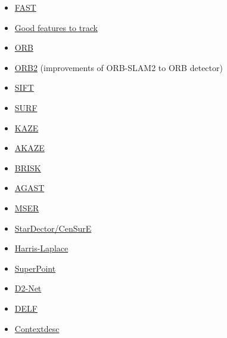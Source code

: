 \documentclass{article}
\begin{document}
\begin{itemize}
    \item \href{https://www.edwardrosten.com/work/fast.html}{FAST} \cite{rosten2006machine}
    \item \href{https://ieeexplore.ieee.org/document/323794}{Good features to track} \cite{shi1994good}
    \item \href{http://www.willowgarage.com/sites/default/files/orb_final.pdf}{ORB} \cite{rublee2011orb}
    \item \href{https://github.com/raulmur/ORB_SLAM2}{ORB2} (improvements of ORB-SLAM2\cite{ORB_SLAM2} to ORB detector)
    \item \href{https://www.cs.ubc.ca/~lowe/papers/iccv99.pdf}{SIFT} \cite{lowe1999object}
    \item \href{http://people.ee.ethz.ch/~surf/eccv06.pdf}{SURF} \cite{bay2006surf}
    \item \href{https://www.doc.ic.ac.uk/~ajd/Publications/alcantarilla_etal_eccv2012.pdf}{KAZE} \cite{alcantarilla2012kaze}
    \item \href{http://www.bmva.org/bmvc/2013/Papers/paper0013/paper0013.pdf}{AKAZE} \cite{alcantarilla2013fast}
    \item \href{http://www.margaritachli.com/papers/ICCV2011paper.pdf}{BRISK} \cite{leutenegger2011brisk}
    \item \href{chrome-extension://efaidnbmnnnibpcajpcglclefindmkaj/https://archive.air.in.tum.de/Main/Publications/Mair2010c.pdf}{AGAST} \cite{mair2010adaptive}
    \item \href{http://cmp.felk.cvut.cz/~matas/papers/matas-bmvc02.pdf}{MSER} \cite{matas2002robust}
    \item \href{https://link.springer.com/chapter/10.1007/978-3-540-88693-8_8}{StarDector/CenSurE} \cite{censure}
    \item \href{https://www.robots.ox.ac.uk/~vgg/research/affine/det_eval_files/mikolajczyk_ijcv2004.pdf}{Harris-Laplace} \cite{mikolajczyk_inria00548554}
    \item \href{https://github.com/MagicLeapResearch/SuperPointPretrainedNetwork}{SuperPoint}\cite{detone18superpoint}
    \item \href{https://github.com/mihaidusmanu/d2-net}{D2-Net} \cite{dusmanu2019d2}
    \item \href{https://github.com/tensorflow/models/tree/master/research/delf}{DELF} \cite{noh2017large}
    \item \href{https://github.com/lzx551402/contextdesc}{Contextdesc} \cite{luo2020contextdesc}

\end{itemize}
\end{document}

